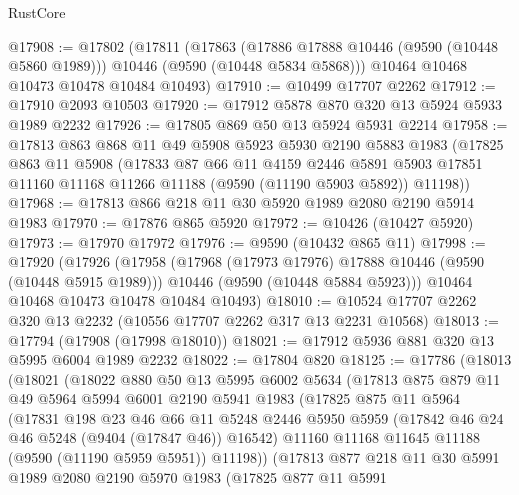 \begin{lexlean}{RustCore}
\begin{coremodule}
@17908 := @17802
    (@17811
      (@17863
        (@17886 @17888 @10446 (@9590 (@10448 @5860 @1989)))
        @10446
        (@9590 (@10448 @5834 @5868)))
      @10464
      @10468
      @10473
      @10478
      @10484
      @10493)
@17910 := @10499 @17707 @2262
@17912 := @17910 @2093 @10503
@17920 := @17912 @5878 @870 @320 @13 @5924 @5933 @1989 @2232
@17926 := @17805 @869 @50 @13 @5924 @5931 @2214
@17958 := @17813
    @863
    @868
    @11
    @49
    @5908
    @5923
    @5930
    @2190
    @5883
    @1983
    (@17825
      @863
      @11
      @5908
      (@17833
        @87
        @66
        @11
        @4159
        @2446
        @5891
        @5903
        @17851
        @11160
        @11168
        @11266
        @11188
        (@9590 (@11190 @5903 @5892))
        @11198))
@17968 := @17813 @866 @218 @11 @30 @5920 @1989 @2080 @2190 @5914 @1983
@17970 := @17876 @865 @5920
@17972 := @10426 (@10427 @5920)
@17973 := @17970 @17972
@17976 := @9590 (@10432 @865 @11)
@17998 := @17920
    (@17926
      (@17958
        (@17968 (@17973 @17976) @17888 @10446 (@9590 (@10448 @5915 @1989)))
        @10446
        (@9590 (@10448 @5884 @5923)))
      @10464
      @10468
      @10473
      @10478
      @10484
      @10493)
@18010 := @10524 @17707 @2262 @320 @13 @2232 (@10556 @17707 @2262 @317 @13 @2231 @10568)
@18013 := @17794 (@17908 (@17998 @18010))
@18021 := @17912 @5936 @881 @320 @13 @5995 @6004 @1989 @2232
@18022 := @17804 @820
@18125 := @17786
    (@18013
      (@18021
        (@18022
          @880
          @50
          @13
          @5995
          @6002
          @5634
          (@17813
            @875
            @879
            @11
            @49
            @5964
            @5994
            @6001
            @2190
            @5941
            @1983
            (@17825
              @875
              @11
              @5964
              (@17831
                @198
                @23
                @46
                @66
                @11
                @5248
                @2446
                @5950
                @5959
                (@17842 @46 @24 @46 @5248 (@9404 (@17847 @46)) @16542)
                @11160
                @11168
                @11645
                @11188
                (@9590 (@11190 @5959 @5951))
                @11198))
            (@17813
              @877
              @218
              @11
              @30
              @5991
              @1989
              @2080
              @2190
              @5970
              @1983
              (@17825
                @877
                @11
                @5991

\end{coremodule}
\end{lexlean}
